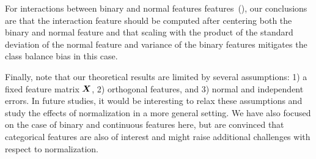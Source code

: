 For interactions between binary and normal features
features~(), our conclusions are that the interaction
feature should be computed after centering both the binary and normal feature and that
scaling with the product of the standard deviation of the normal feature and variance of
the binary features mitigates the class balance bias in this case.

Finally, note that our theoretical results are limited by several assumptions: 1) a fixed
feature matrix \(\boldsymbol{X}\), 2) orthogonal features, and 3) normal and independent errors.
In future studies, it would be interesting to relax these assumptions and study the effects
of normalization in a more general setting. We have also focused on the case of binary and
continuous features here, but are convinced that categorical features are also of interest
and might raise additional challenges with respect to normalization.
